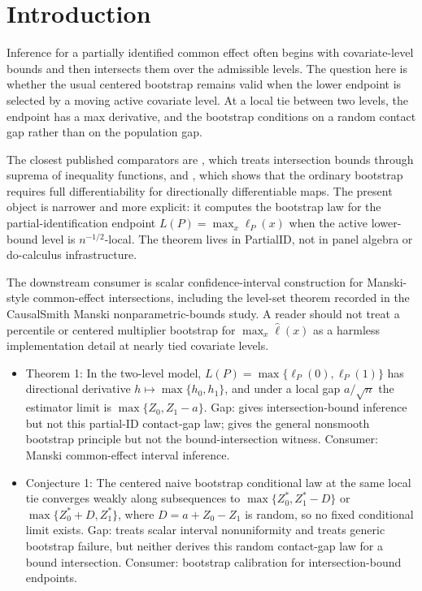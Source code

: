 \documentclass[11pt]{article}
\theoremstyle{definition}
\theoremstyle{plain}
\theoremstyle{remark}
\begin{document}
\section{Introduction}
Inference for a partially identified common effect often begins with covariate-level bounds and then intersects them over the admissible levels. The question here is whether the usual centered bootstrap remains valid when the lower endpoint is selected by a moving active covariate level. At a local tie between two levels, the endpoint has a max derivative, and the bootstrap conditions on a random contact gap rather than on the population gap.

The closest published comparators are \citet[Sec. 2, eqs. (2.1)--(2.3)]{ChernozhukovLeeRosen2013}, which treats intersection bounds through suprema of inequality functions, and \citet[Theorem 3.1]{FangSantos2019}, which shows that the ordinary bootstrap requires full differentiability for directionally differentiable maps. The present object is narrower and more explicit: it computes the bootstrap law for the partial-identification endpoint \(L(P)=\max_x\ell_P(x)\) when the active lower-bound level is \(n^{-1/2}\)-local. The theorem lives in PartialID, not in panel algebra or do-calculus infrastructure.

The downstream consumer is scalar confidence-interval construction for Manski-style common-effect intersections, including the level-set theorem recorded in the CausalSmith Manski nonparametric-bounds study. A reader should not treat a percentile or centered multiplier bootstrap for \(\max_x\widehat\ell(x)\) as a harmless implementation detail at nearly tied covariate levels.

\begin{itemize}[leftmargin=*]
\item Theorem 1: In the two-level model, \(L(P)=\max\{\ell_P(0),\ell_P(1)\}\) has directional derivative \(h\mapsto\max\{h_0,h_1\}\), and under a local gap \(a/\sqrt n\) the estimator limit is \(\max\{Z_0,Z_1-a\}\). Gap: \citet{ChernozhukovLeeRosen2013} gives intersection-bound inference but not this partial-ID contact-gap law; \citet{FangSantos2019} gives the general nonsmooth bootstrap principle but not the bound-intersection witness. Consumer: Manski common-effect interval inference.
\item Conjecture 1: The centered naive bootstrap conditional law at the same local tie converges weakly along subsequences to \(\max\{Z_0^\ast,Z_1^\ast-D\}\) or \(\max\{Z_0^\ast+D,Z_1^\ast\}\), where \(D=a+Z_0-Z_1\) is random, so no fixed conditional limit exists. Gap: \citet{ImbensManski2004} treats scalar interval nonuniformity and \citet{FangSantos2019} treats generic bootstrap failure, but neither derives this random contact-gap law for a bound intersection. Consumer: bootstrap calibration for intersection-bound endpoints.
\end{itemize}
\end{document}
